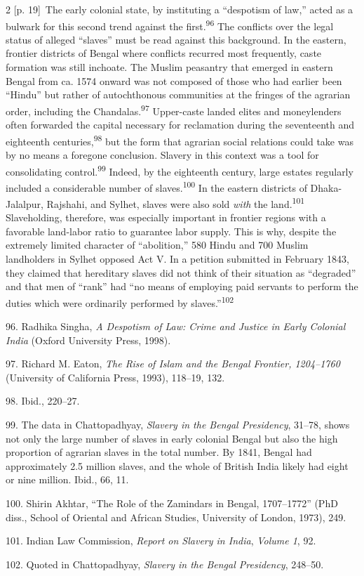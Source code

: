 \documentclass[10pt,a4paper]{article}
\begin{document}
\begin{paracol}{2}
\switchcolumn
{\scriptsize\color{gray} [p. 19]}\ The early colonial state, by instituting a “despotism of law,” acted as a bulwark for this second trend against the first.\nobreak\textsuperscript{96} The conflicts over the legal status of alleged “slaves” must be read against this background. In the eastern, frontier districts of Bengal where conflicts recurred most frequently, caste formation was still inchoate. The Muslim peasantry that emerged in eastern Bengal from ca. 1574 onward was not composed of those who had earlier been “Hindu” but rather of autochthonous communities at the fringes of the agrarian order, including the Chandalas.\nobreak\textsuperscript{97} Upper-caste landed elites and moneylenders often forwarded the capital necessary for reclamation during the seventeenth and eighteenth centuries,\nobreak\textsuperscript{98} but the form that agrarian social relations could take was by no means a foregone conclusion. Slavery in this context was a tool for consolidating control.\nobreak\textsuperscript{99} Indeed, by the eighteenth century, large estates regularly included a considerable number of slaves.\nobreak\textsuperscript{100} In the eastern districts of Dhaka-Jalalpur, Rajshahi, and Sylhet, slaves were also sold \textit{with} the land.\nobreak\textsuperscript{101} Slaveholding, therefore, was especially important in frontier regions with a favorable land-labor ratio to guarantee labor supply. This is why, despite the extremely limited character of “abolition,” 580 Hindu and 700 Muslim landholders in Sylhet opposed Act V. In a petition submitted in February 1843, they claimed that hereditary slaves did not think of their situation as “degraded” and that men of “rank” had “no means of employing paid servants to perform the duties which were ordinarily performed by slaves.”\nobreak\textsuperscript{102}\par{\small 96. Radhika Singha, \textit{A Despotism of Law: Crime and Justice in Early Colonial India} (Oxford University Press, 1998).\par}{\small 97. Richard M. Eaton, \textit{The Rise of Islam and the Bengal Frontier, 1204–1760} (University of California Press, 1993), 118–19, 132.\par}{\small 98. Ibid., 220–27.\par}{\small 99. The data in Chattopadhyay, \textit{Slavery in the Bengal Presidency}, 31–78, shows not only the large number of slaves in early colonial Bengal but also the high proportion of agrarian slaves in the total number. By 1841, Bengal had approximately 2.5 million slaves, and the whole of British India likely had eight or nine million. Ibid., 66, 11.\par}{\small 100. Shirin Akhtar, “The Role of the Zamindars in Bengal, 1707–1772” (PhD diss., School of Oriental and African Studies, University of London, 1973), 249.\par}{\small 101. Indian Law Commission, \textit{Report on Slavery in India}, \textit{Volume 1}, 92.\par}{\small 102. Quoted in Chattopadhyay, \textit{Slavery in the Bengal Presidency}, 248–50.\par}

\end{paracol}
\end{document}
